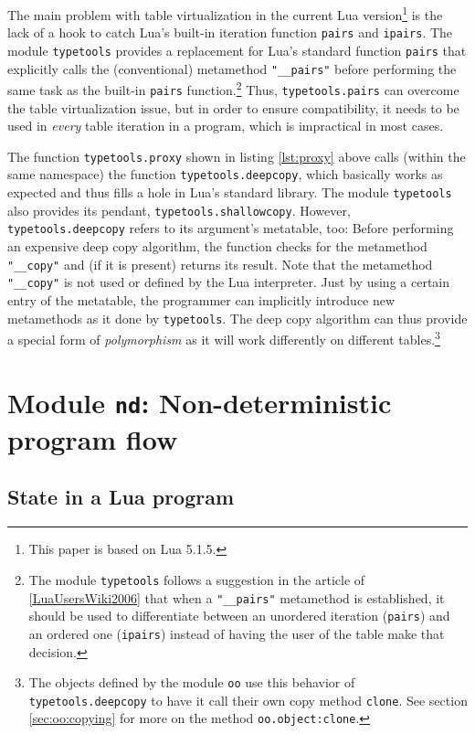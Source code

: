 The main problem with table virtualization in the current Lua version\footnote{This paper is based on Lua 5.1.5.} is the lack of a hook to catch Lua's built-in iteration function \texttt{pairs} and \texttt{ipairs}. The module \texttt{typetools} provides a replacement for Lua's standard function \texttt{pairs} that explicitly calls the (conventional) metamethod \texttt{"\_\_pairs"} before performing the same task as the built-in \texttt{pairs} function.\footnote{The module \texttt{typetools} follows a suggestion in the article  of \ref{LuaUsersWiki2006} that when a \texttt{"\_\_pairs"} metamethod is established, it should be used to differentiate between an unordered iteration (\texttt{pairs}) and an ordered one (\texttt{ipairs}) instead of having the user of the table make that decision.} Thus, \texttt{typetools.pairs} can overcome the table virtualization issue, but in order to ensure compatibility, it needs to be used in \emph{every} table iteration in a program, which is impractical in most cases.

The function \texttt{typetools.proxy} shown in listing \ref{lst:proxy} above calls (within the same namespace) the function \texttt{typetools.deepcopy}, which basically works as expected and thus fills a hole in Lua's standard library. The module \texttt{typetools} also provides its pendant, \texttt{typetools.shallowcopy}. However, \texttt{typetools.deepcopy} refers to its argument's metatable, too: Before performing an expensive deep copy algorithm, the function checks for the metamethod \texttt{"\_\_copy"} and (if it is present) returns its result. Note that the metamethod \texttt{"\_\_copy"} is not used or defined by the Lua interpreter. Just by using a certain entry of the metatable, the programmer can implicitly introduce new metamethods as it done by \texttt{typetools}. The deep copy algorithm can thus provide a special form of \emph{polymorphism} as it will work differently on different tables.\footnote{The objects defined by the module \texttt{oo} use this behavior of \texttt{typetools.deepcopy} to have it call their own copy method \texttt{clone}. See section \ref{sec:oo:copying} for more on the method \texttt{oo.object:clone}.}


\section{Module \texttt{nd}: Non-deterministic program flow}

\subsection{State in a Lua program}

